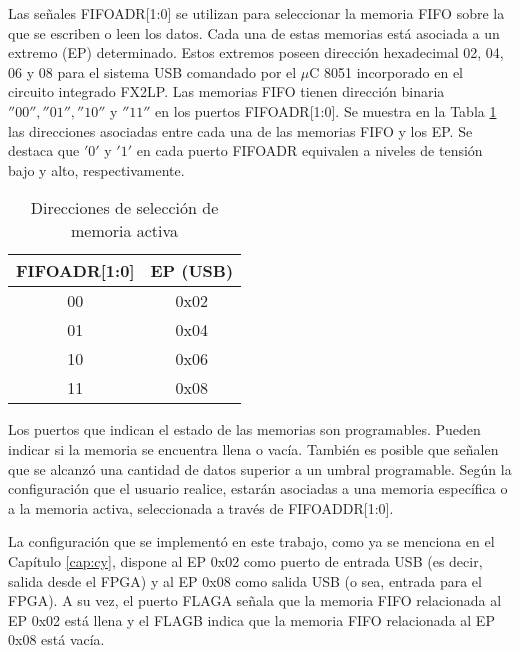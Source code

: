 	
	Las señales FIFOADR[1:0] se utilizan para seleccionar la memoria FIFO sobre la que se escriben o leen los datos. Cada una de estas memorias está asociada a un extremo (EP) determinado. Estos extremos poseen dirección hexadecimal 02, 04, 06 y 08 para el sistema USB comandado por el $\mu$C 8051 incorporado en el circuito integrado FX2LP. Las memorias FIFO tienen dirección binaria $''00'', ''01'', ''10''$ y $''11''$ en los puertos FIFOADR[1:0]. Se muestra en la Tabla \ref{tab:fifoadr} las direcciones asociadas entre cada una de las memorias FIFO y los EP. Se destaca que $'0'$ y $'1'$ en cada puerto FIFOADR equivalen a niveles de tensión bajo y alto, respectivamente.
	
	\begin{table}[]
		\centering
		\begin{tabular}{cc}
			\hline
			FIFOADR[1:0] & EP (USB)\\
			\hline
			00 & 0x02\\
			01 & 0x04\\
			10 & 0x06\\
			11 & 0x08\\
			\hline
		\end{tabular}
		\caption{Direcciones de selección de memoria activa}
		\label{tab:fifoadr}
	\end{table}
	
	Los puertos que indican el estado de las memorias son programables. Pueden indicar si la memoria se encuentra llena o vacía. También es posible que señalen que se alcanzó una cantidad de datos superior a un umbral programable. Según la configuración que el usuario realice, estarán asociadas a una memoria específica o a la memoria activa, seleccionada a través de FIFOADDR[1:0].
	
	
	La configuración que se implementó en este trabajo, como ya se menciona en el Capítulo \ref{cap:cy}, dispone al EP 0x02 como puerto de entrada USB (es decir, salida desde el FPGA) y al EP 0x08 como salida USB (o sea, entrada para el FPGA). A su vez, el puerto FLAGA señala que la memoria FIFO relacionada al EP 0x02 está llena y el FLAGB indica que la memoria FIFO relacionada al EP 0x08 está vacía.
	
